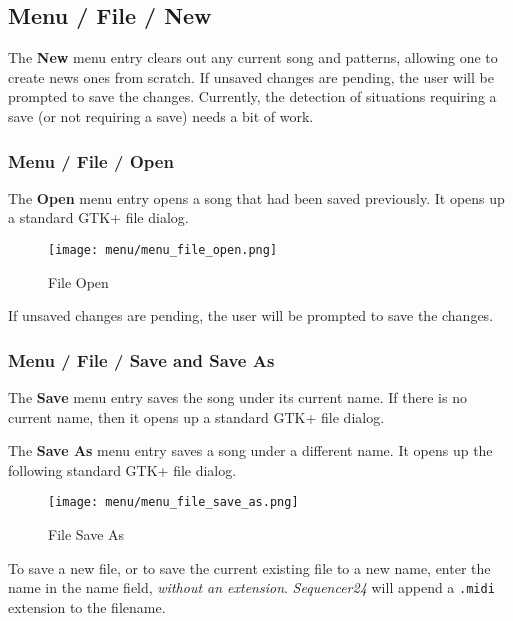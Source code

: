 \subsection{Menu / File / New}
\label{subsec:menu_file_new}

   The \textbf{New} menu entry clears out any current song and patterns,
   allowing one to create news ones from scratch.
   If unsaved changes are pending, the user will be prompted to save the
   changes.
   Currently, the detection of situations requiring a save (or not requiring
   a save) needs a bit of work.

\subsubsection{Menu / File / Open}
\label{subsubsec:seq24_menu_file_open}

   The \textbf{Open} menu entry opens a song that had been saved previously.
   It opens up a standard GTK+ file dialog.

\begin{figure}[H]
   \centering 
   \texttt{[image: menu/menu\_file\_open.png]}
   \caption{File Open}
   \label{fig:seq24_menu_file_open}
\end{figure}

   If unsaved changes are pending, the user will be prompted to save the
   changes.

\subsubsection{Menu / File / Save and Save As}
\label{subsubsec:menu_file_open_save_as}

   The \textbf{Save} menu entry saves the song under its current name.
   If there is no current name, then
   it opens up a standard GTK+ file dialog.

   The \textbf{Save As} menu entry saves a song under a different name.
   It opens up the following standard GTK+ file dialog.

\begin{figure}[H]
   \centering 
   \texttt{[image: menu/menu\_file\_save\_as.png]}
   \caption{File Save As}
   \label{fig:seq24_menu_file_save_as}
\end{figure}

   To save a new file, or to save the current existing file to a new name,
   enter the name in the name field, \textsl{without an extension}.
   \textsl{Sequencer24} will append a \texttt{.midi} extension to the filename.


